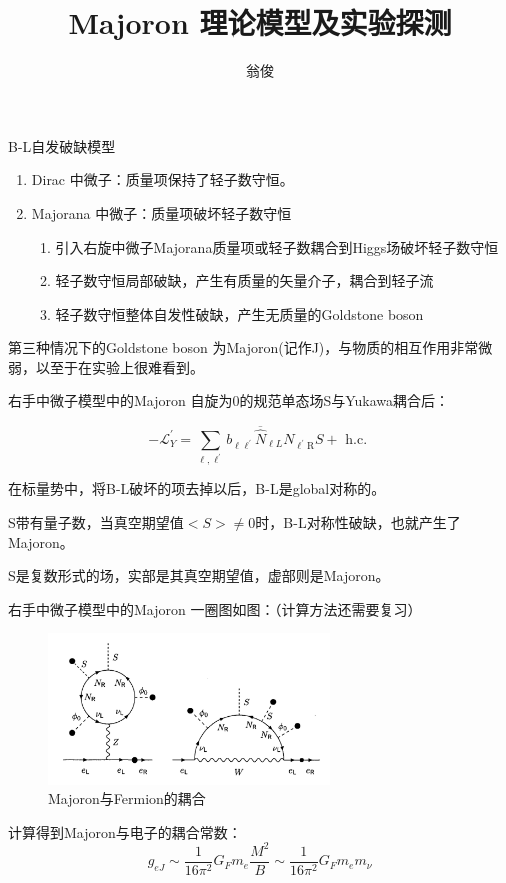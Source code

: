 \documentclass[11pt]{beamer}
\author{翁俊}
\title{Majoron 理论模型及实验探测}
\date{}
\begin{document}
\begin{frame}
\titlepage
\end{frame}


\begin{frame}{B-L自发破缺模型}
\begin{enumerate}
\item {Dirac 中微子：质量项保持了轻子数守恒。}
\item {Majorana 中微子：质量项破坏轻子数守恒
\begin{enumerate}
\item {引入右旋中微子Majorana质量项或轻子数耦合到Higgs场破坏轻子数守恒}
\item {轻子数守恒局部破缺，产生有质量的矢量介子，耦合到轻子流}
\item {轻子数守恒整体自发性破缺，产生无质量的Goldstone  boson}
\end{enumerate}
}
\end{enumerate}
第三种情况下的Goldstone boson 为Majoron(记作J)，与物质的相互作用非常微弱，以至于在实验上很难看到。
\end{frame}

\begin{frame}{右手中微子模型中的Majoron}
自旋为0的规范单态场S与Yukawa耦合后：

$$
-\mathscr{L}_{Y}^{\prime}=\sum_{\ell, \ell^{\prime}} b_{\ell \ell^{\prime}} \overline{\widehat{N}}_{\ell L} N_{\ell^{\prime} \mathrm{R}} S+\text { h.c. }
$$

在标量势中，将B-L破坏的项去掉以后，B-L是global对称的。

S带有量子数，当真空期望值$<S>\neq 0$时，B-L对称性破缺，也就产生了Majoron。

S是复数形式的场，实部是其真空期望值，虚部则是Majoron。


\end{frame}

\begin{frame}{右手中微子模型中的Majoron}
一圈图如图：（计算方法还需要复习）
\begin{figure}[H]
 \centering
 \includegraphics[height=4cm]{pic/1.png}
 \caption{Majoron与Fermion的耦合}
 \label{fig:1}
\end{figure}
计算得到Majoron与电子的耦合常数：
$$
g_{e J} \sim \frac{1}{16 \pi^{2}} G_{F} m_{e} \frac{M^{2}}{B} \sim \frac{1}{16 \pi^{2}} G_{F} m_{e} m_{\nu}
$$

\end{frame}
\end{document}

